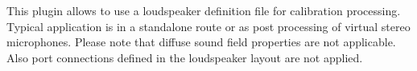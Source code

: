 This plugin allows to use a loudspeaker definition file for
calibration processing. Typical application is in a standalone route
or as post processing of virtual stereo microphones. Please note that
diffuse sound field properties are not applicable. Also port
connections defined in the loudspeaker layout are not applied.



